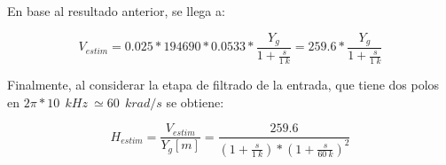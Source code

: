 En base al resultado anterior, se llega a:



\begin{equation}
 V_{estim}=0.025*194690*0.0533 * \frac{Y_{g}}{1 + \frac{s}{1\:k}}=259.6*\frac{Y_{g}}{1 + \frac{s}{1\:k}}	
\end{equation}

\noindent Finalmente, al considerar la etapa de filtrado de la entrada, que tiene dos polos en $2\pi *10\: \:{kHz}\ \simeq 60\: \:{krad/s}$ se obtiene:

\begin{equation} \label{eq_TLC_deriv_7}
	H_{estim}=\frac{V_{estim}}{Y_{g}[m]}=\frac{259.6}{(1+\frac{s}{1\:k})*{(1+\frac{s}{60\: k})}^2}
\end{equation}

